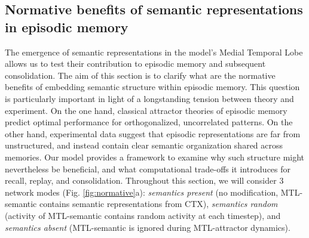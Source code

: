 \documentclass{article}
\begin{document}
\subsection*{Normative benefits of semantic representations in episodic memory}
The emergence of semantic representations in the model's Medial Temporal Lobe allows us to test their contribution to episodic memory and subsequent consolidation. The aim of this section is to clarify what are the normative benefits of embedding semantic structure within episodic memory. This question is particularly important in light of a longstanding tension between theory and experiment. On the one hand, classical attractor theories of episodic memory predict optimal performance for orthogonalized, uncorrelated patterns. On the other hand, experimental data suggest that episodic representations are far from unstructured, and instead contain clear semantic organization shared across memories. Our model provides a framework to examine why such structure might nevertheless be beneficial, and what computational trade-offs it introduces for recall, replay, and consolidation.
\newline\newline
Throughout this section, we will consider 3 network modes (Fig. \ref{fig:normative}a): \textit{semantics present} (no modification, MTL-semantic contains semantic representations from CTX), \textit{semantics random} (activity of MTL-semantic contains random activity at each timestep), and \textit{semantics absent}  (MTL-semantic is ignored during MTL-attractor dynamics). 
\end{document}
